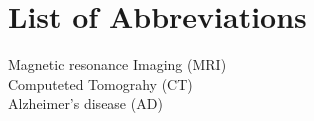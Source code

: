 \chapter*{List of Abbreviations}
Magnetic resonance Imaging (MRI)\\Computeted Tomograhy (CT)\\Alzheimer’s
disease (AD)
\printnoidxglossary[type=acronym,title={}]

